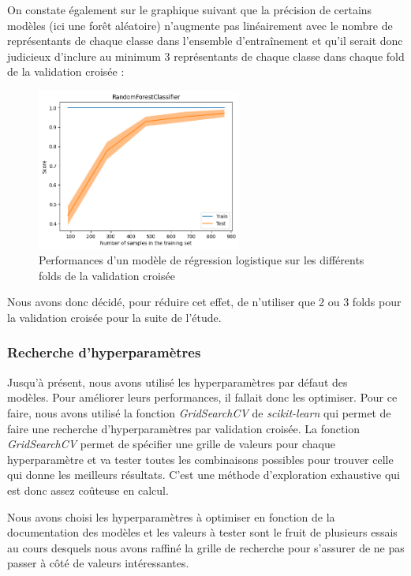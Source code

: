 \documentclass{article}
\begin{document}
On constate également sur le graphique suivant que la précision de certains modèles
(ici une forêt aléatoire) n'augmente
pas linéairement avec le nombre de représentants de chaque classe dans l'ensemble d'entraînement
et qu'il serait donc judicieux d'inclure au minimum 3 représentants de chaque classe dans chaque
fold de la validation croisée :

\begin{figure}[h]
    \centering
    \includegraphics[width=0.6\textwidth]{img/perf_vs_samples_rf.png}
    \caption{Performances d'un modèle de régression logistique sur les différents folds de la validation croisée}
\end{figure}

Nous avons donc décidé, pour réduire cet effet, de n'utiliser que 2 ou 3 folds pour la
validation croisée pour la suite de l'étude.

\subsubsection{Recherche d'hyperparamètres}
Jusqu'à présent, nous avons utilisé les hyperparamètres par défaut des \\modèles. Pour améliorer
leurs performances, il fallait donc les optimiser. Pour ce faire, nous avons utilisé la fonction
\textit{GridSearchCV} \cite{GSCV} de \textit{scikit-learn} qui permet de faire une recherche
d'hyperparamètres par validation croisée. La fonction \textit{GridSearchCV} permet de spécifier
une grille de valeurs pour chaque hyperparamètre et va tester toutes les combinaisons possibles
pour trouver celle qui donne les meilleurs résultats. C'est une méthode d'exploration exhaustive
qui est donc assez coûteuse en calcul.

Nous avons choisi les hyperparamètres à optimiser en fonction de la documentation des modèles
et les valeurs à tester sont le fruit de plusieurs essais au cours desquels nous avons
raffiné la grille de recherche pour s'assurer de ne pas passer à côté de valeurs intéressantes.
\end{document}
